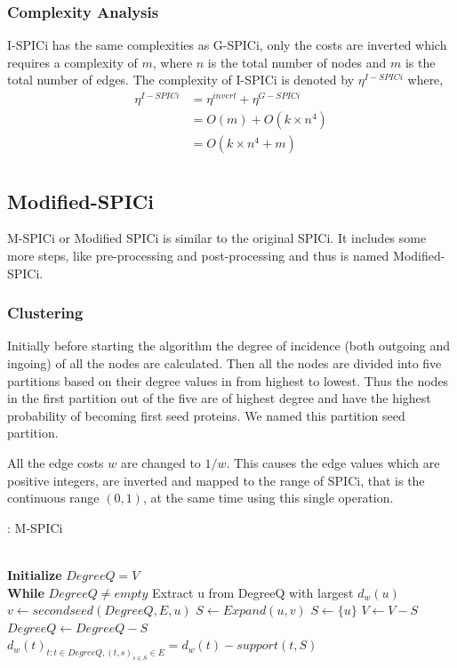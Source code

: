 \documentclass[a4paper,twocolumn,preprint]{elsarticle}
\begin{document}
\subsubsection{Complexity Analysis}
I-SPICi has the same complexities as G-SPICi, only the costs are inverted which requires a complexity of $m$, where $n$ is the total number of nodes and $m$ is the total number of edges. The complexity of I-SPICi is denoted by $\eta^{I-SPICi}$ where,
\begin{equation}
\begin{split}
\eta^{I-SPICi} &= \eta^{invert} + \eta^{G-SPICi}\\
&= O(m)+O(k\times n^4)\\
&= O(k\times n^4 + m)\\
\end{split}
\end{equation}
\subsection{Modified-SPICi}
M-SPICi or Modified SPICi is similar to the original SPICi. It includes some more steps, like pre-processing and post-processing and thus is named Modified-SPICi.

\subsubsection{Clustering}
Initially before starting the algorithm the degree of incidence (both outgoing and ingoing) of all the nodes are calculated. Then all the nodes are divided into five partitions based on their degree values in from highest to lowest. Thus the nodes in the first partition out of the five are of highest degree and have the highest probability of becoming first seed proteins. We named this partition seed partition.

All the edge costs $w$ are changed to $1/w$. This causes the edge values which are positive integers, are inverted and mapped to the range of SPICi, that is the continuous range $(0,1)$, at the same time using this single operation.

\begin{algorithm}
	\caption{: M-SPICi}\label{mpicicode}
	\begin{algorithmic}[1]
		 \\
		\textbf{Initialize} $DegreeQ = V$ \\
		\textbf{While} $DegreeQ \neq empty$
		\State Extract u from DegreeQ with largest $d_w(u)$
		\State $v \gets secondseed(DegreeQ,E,u)$
		 $S \gets Expand(u,v)$
		\EndIf
		\Else 
		\State $S \gets \{u\}$
		\EndIf
		\State $V \gets V - S $
		\State $Degree Q \gets Degree Q - S$
		\State $d_w(t)_{t:t\in DegreeQ,(t,s)_{s\in S}\in E} = d_w(t) - support(t,S)$
		\EndProcedure
	\end{algorithmic}
\end{algorithm}
\end{document}
